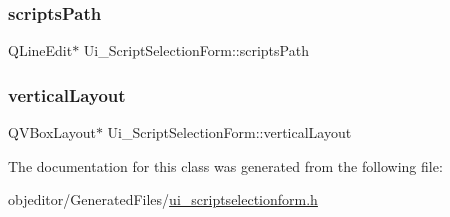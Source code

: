 \subsubsection{\texorpdfstring{scriptsPath}{scriptsPath}}
{\footnotesize\ttfamily Q\+Line\+Edit$\ast$ Ui\+\_\+\+Script\+Selection\+Form\+::scripts\+Path}

\mbox{\label{class_ui___script_selection_form_a853841b74f7457a21ed7d36c20fc4641}} 
\subsubsection{\texorpdfstring{verticalLayout}{verticalLayout}}
{\footnotesize\ttfamily Q\+V\+Box\+Layout$\ast$ Ui\+\_\+\+Script\+Selection\+Form\+::vertical\+Layout}



The documentation for this class was generated from the following file\+:\begin{DoxyCompactItemize}
\item 
objeditor/\+Generated\+Files/\mbox{\hyperlink{ui__scriptselectionform_8h}{ui\+\_\+scriptselectionform.\+h}}\end{DoxyCompactItemize}
